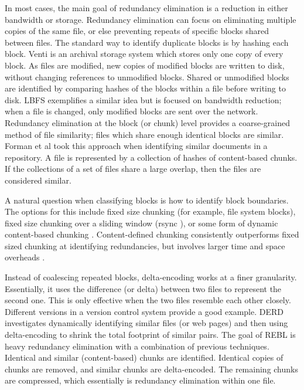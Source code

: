\documentclass[10pt, twocolumn]{article}
\begin{document}
In most cases, the main goal of redundancy elimination is a reduction in either bandwidth or storage. Redundancy elimination  can focus on eliminating multiple copies of the same file, or else preventing repeats of specific blocks shared between files. The standard way to identify duplicate blocks is by hashing each block. Venti \cite{venti} is an archival storage system which stores only one copy of every block. As files are modified, new copies of modified blocks are written to disk, without changing references to unmodified blocks. Shared or unmodified blocks are identified by comparing hashes of the blocks within a file before writing to disk. LBFS \cite{lbfs} exemplifies a similar idea but is focused on bandwidth reduction; when a file is changed, only modified blocks are sent over the network. Redundancy elimination at the block (or chunk) level provides a coarse-grained method of file similarity; files which share enough identical blocks are similar. Forman et al\cite{hpDocRepositories} took this approach when identifying similar documents in a repository. A file is represented by a collection of hashes of content-based chunks. If the collections of a set of files share a large overlap, then the files are considered similar.

A natural question when classifying blocks is how to identify block boundaries. The options for this include fixed size chunking (for example, file system blocks), fixed size chunking over a sliding window (rsync \cite{rsync}), or some form of dynamic content-based chunking \cite{lbfs}. Content-defined chunking consistently outperforms fixed sized chunking at identifying redundancies, but involves larger time and space overheads  \cite{policroniades2004adr}.

Instead of coalescing repeated blocks, delta-encoding works at a finer granularity. Essentially, it uses the difference (or delta) between two files to represent the second one. This is only effective when the two files resemble each other closely.  Different versions in a version control system provide a good example. DERD \cite{derd} investigates dynamically identifying similar files (or web pages) and then using delta-encoding to shrink the total footprint of similar pairs. The goal of REBL \cite{rebl} is heavy redundancy elimination with a combination of previous techniques. Identical and similar (content-based) chunks are identified. Identical copies of chunks are removed, and similar chunks are delta-encoded. The remaining chunks are compressed, which essentially is redundancy elimination within one file.
\end{document}
